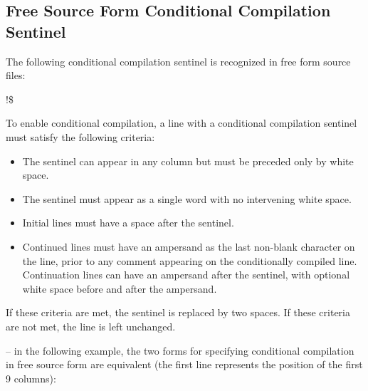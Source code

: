 \begin{figure}[t!]
\end{figure}





\subsection{Free Source Form Conditional Compilation Sentinel}
\label{subsec:Free Source Form Conditional Compilation Sentinel}
The following conditional compilation sentinel is recognized in free form source files:

\begin{boxedcode}
!\$
\end{boxedcode}

To enable conditional compilation, a line with a conditional compilation sentinel must 
satisfy the following criteria: 

\begin{itemize}
\item The sentinel can appear in any column but must be preceded only by white space.

\item The sentinel must appear as a single word with no intervening white space. 

\item Initial lines must have a space after the sentinel. 

\item Continued lines must have an ampersand as the last non-blank character on the line, 
prior to any comment appearing on the conditionally compiled line. Continuation lines 
can have an ampersand after the sentinel, with optional white space before and after 
the ampersand. 
\end{itemize}

If these criteria are met, the sentinel is replaced by two spaces. If these criteria are not 
met, the line is left unchanged. 

\notestart
\noteheader – in the following example, the two forms for specifying conditional compilation 
in free source form are equivalent (the first line represents the position of the first 9 
columns):

\begin{alltt}
\end{alltt}
\noteend
\bigskip
\fortranspecificend









